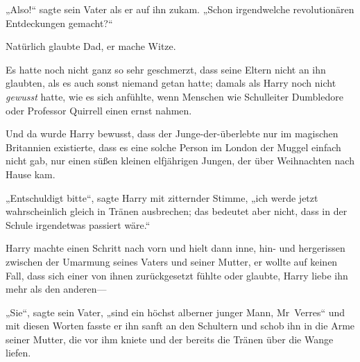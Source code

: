 „Also!“ sagte sein Vater als er auf ihn zukam.
„Schon irgendwelche revolutionären Entdeckungen gemacht?“

Natürlich glaubte Dad, er mache Witze.

Es hatte noch nicht ganz so sehr geschmerzt, dass seine Eltern nicht an ihn glaubten, als es auch sonst niemand getan hatte; damals als Harry noch nicht \emph{gewusst} hatte, wie es sich anfühlte, wenn Menschen wie Schulleiter Dumbledore oder Professor Quirrell einen ernst nahmen.

Und da wurde Harry bewusst, dass der Junge-der-überlebte nur im magischen Britannien existierte, dass es eine solche Person im London der Muggel einfach nicht gab, nur einen süßen kleinen elfjährigen Jungen, der über Weihnachten nach Hause kam.

„Entschuldigt bitte“, sagte Harry mit zitternder Stimme, „ich werde jetzt wahrscheinlich gleich in Tränen ausbrechen; das bedeutet aber nicht, dass in der Schule irgendetwas passiert wäre.“

Harry machte einen Schritt nach vorn und hielt dann inne, hin- und hergerissen zwischen der Umarmung seines Vaters und seiner Mutter, er wollte auf keinen Fall, dass sich einer von ihnen zurückgesetzt fühlte oder glaubte, Harry liebe ihn mehr als den anderen—

„Sie“, sagte sein Vater, „sind ein höchst alberner junger Mann, Mr~Verres“ und mit diesen Worten fasste er ihn sanft an den Schultern und schob ihn in die Arme seiner Mutter, die vor ihm kniete und der bereits die Tränen über die Wange liefen.

